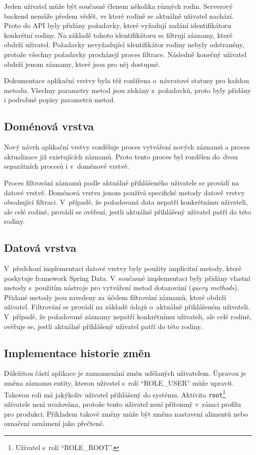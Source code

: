         
        Jeden uživatel může být současně členem několika různých rodin. Serverový backend nemůže předem vědět, ve které rodině se aktuálně uživatel nachází. Proto do API byly přidány požadavky, které vyžadují zadání identifikátoru konkrétní rodiny. Na základě tohoto identifikátoru se filtrují záznamy, které obdrží uživatel. Požadavky nevyžadující identifikátor rodiny nebyly odstraněny, protože všechny požadavky procházejí proces filtrace. Následně konečný uživatel obdrží jenom záznamy, které jsou pro něj dostupné.
        
        
        Dokumentace aplikační vrstvy byla též rozšířena o~návratové statusy pro každou metodu. Všechny parametry metod jsou získány z~požadavků, proto byly přidány i podrobné popisy parametrů metod. 
        
    \subsection{Doménová vrstva}%
        Nový návrh aplikační vrstvy rozděluje proces vytváření nových záznamů a proces aktualizace již existujících záznamů. Proto tento proces byl rozdělen do~dvou separátních procesů i v~doménové vrstvě.
        
        
        Proces filtrování záznamů podle aktuálně přihlášeného uživatele se provádí na datové vrstvě. Doménová vrstva jenom používá specifické metody datové vrstvy obsahující filtraci. V~případě, že požadovaná data nepatří konkrétnímu uživateli, ale celé rodině, provádí se ověření, jestli aktuálně přihlášený uživatel patří do této rodiny.
        
    \subsection{Datová vrstva}
        V~předchozí implementaci datové vrstvy byly použity implicitní metody, které poskytuje framework Spring Data. V~současné implementaci byly přidány vlastní metody s~použitím nástroje pro vytváření metod dotazování (\textit{query methods}). Přidané metody jsou zavedeny za účelem filtrování záznamů, které obdrží uživatel. Filtrování se provádí na základě údajů o~aktuálně přihlášeném uživateli.
        V~případě, že požadované záznamy nepatří konkrétnímu uživateli, ale celé rodině, ověřuje se, jestli aktuálně přihlášený uživatel patří do této rodiny.
    
    \subsection{Implementace historie změn}
        Důležitou částí aplikace je zaznamenání změn udělaných uživatelem. Úpravou je změna záznamu entity, kterou uživatel s~rolí \enquote{ROLE\_USER} může upravit. Takovou roli má jakýkoliv uživatel přihlášený do systému. Aktivita \texttt{root}\footnote{Uživatel s~rolí \enquote{ROLE\_ROOT}.} uživatele není uvažována, protože tento uživatel není přítomný v~rámci profilu pro produkci. Příkladem takové změny může být změna nastavení alimentů nebo označení oznámení jako přečtené.
    
